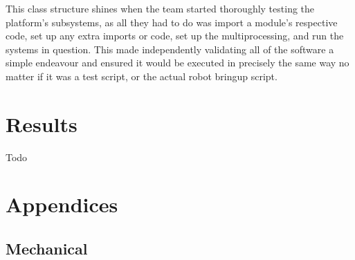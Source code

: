 \documentclass[11pt, twoside]{report}
\begin{document}
This class structure shines when the team started thoroughly testing the platform’s subsystems, as all they had to do was import a module’s respective code, set up any extra imports or code, set up the multiprocessing, and run the systems in question. This made independently validating all of the software a simple endeavour and ensured it would be executed in precisely the same way no matter if it was a test script, or the actual robot bringup script.


\section{Results}
Todo


\setcounter{secnumdepth}{3}
\section{Appendices}
\renewcommand{\thesubsection}{\Alph{subsection}}
\renewcommand{\thesubsubsection}{\Alph{subsection}.\arabic{subsubsection}}

\subsection{Mechanical} \label{app:mech}
\end{document}
